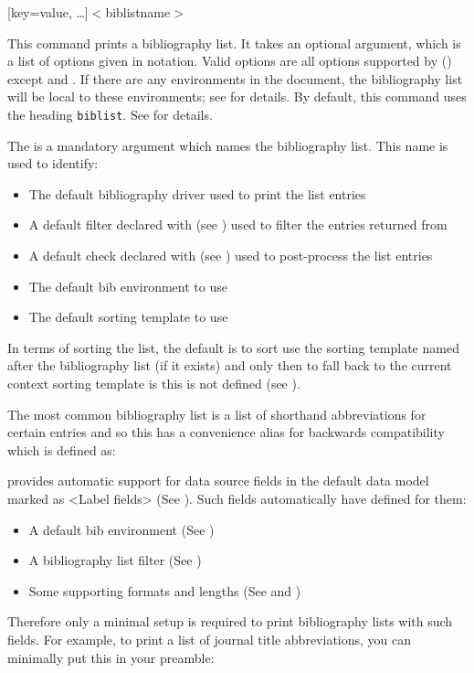 \documentclass{ltxdockit}[2011/03/25]
\newcommand*{\biber}{\sty{biber}\xspace}
\newcommand*{\biblatex}{\sty{biblatex}\xspace}
\begin{document}
\begin{ltxsyntax}

[key=value, \dots]{$<$biblistname$>$}

This command prints a bibliography list. It takes an optional argument, which is a list of options given in \keyval notation. Valid options are all options supported by  () except  and . If there are any  environments in the document, the bibliography list will be local to these environments; see  for details. By default, this command uses the heading \texttt{biblist}. See  for details.

The  is a mandatory argument which names the bibliography list. This name is used to identify:
\begin{itemize}
\item The default bibliography driver used to print the list entries
\item A default filter declared with  (see ) used to filter the entries returned from \biber
\item A default check declared with  (see ) used to post-process the list entries
\item The default bib environment to use
\item The default sorting template to use
\end{itemize}

In terms of sorting the list, the default is to sort use the sorting template named after the bibliography list (if it exists) and only then to fall back to the current context sorting template is this is not defined (see ).

The most common bibliography list is a list of shorthand abbreviations for certain entries and so this has a convenience alias  for backwards compatibility which is defined as:

\begin{ltxexample}
\end{ltxexample}

\biblatex provides automatic support for data source fields in the default data model marked as <Label fields> (See ). Such fields automatically have defined for them:

\begin{itemize}
\item A default bib environment (See )
\item A bibliography list filter (See )
\item Some supporting formats and lengths (See  and )
\end{itemize}
%
Therefore only a minimal setup is required to print bibliography lists with such fields. For example, to print a list of journal title abbreviations, you can minimally put this in your preamble:


\end{ltxsyntax}
\end{document}
